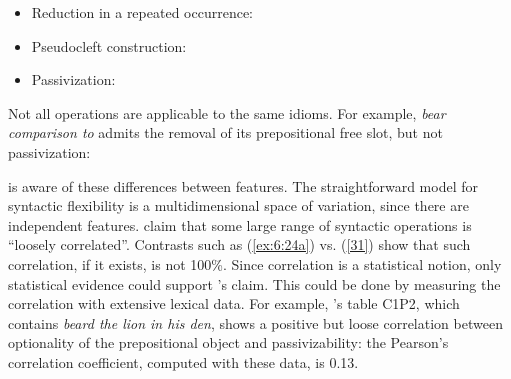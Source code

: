 \documentclass[output=paper]{langsci/langscibook}
\begin{document}
\begin{itemize}
\item Reduction in a repeated occurrence: 

\begin{exe}
\ex \label{ex:6:28}
\begin{xlist}
\end{xlist}
\end{exe}

\newpage 
\item Pseudocleft construction:

\begin{exe}
\ex \label{ex:6:29}
\begin{xlist}
\end{xlist}
\end{exe}

\item Passivization:

\begin{exe}
\ex \label{ex:6:30} 
\begin{xlist}
\end{xlist}
\end{exe}

\end{itemize}

Not all operations are applicable to the same idioms. For example, \textit{bear comparison to} admits the removal of its prepositional free slot, but not passivization:


\begin{exe}
\end{exe}

\noindent \citet[34]{Fraser1970} is aware of these differences between features. 
The straightforward model for syntactic flexibility is a multidimensional space of variation, since there are independent features. \cite[509]{Nunberg1994} claim that some large range of syntactic operations  is “loosely correlated”. Contrasts such as (\ref{ex:6:24a}) vs. (\ref{31}) show that such correlation, if it exists, is not 100\%. Since correlation is a statistical notion, only statistical evidence could support \cite{Nunberg1994}'s claim. This could be done by measuring the correlation with extensive lexical data. For example, \citet{Freckleton1985}'s table C1P2, which contains \textit{beard the lion in his den}, shows a positive but loose correlation between optionality of the prepositional object and passivizability: the Pearson’s correlation coefficient, computed with these data, is 0.13.
\end{document}
